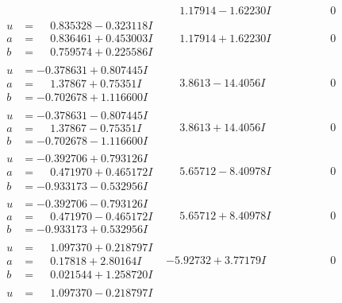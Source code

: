 \documentclass[1p]{elsarticle_modified}
\theoremstyle{definition}
\begin{document}
$$\begin{array}{c|c|c}
 & \phantom{-}1.17914 - 1.62230 I & \phantom{-0.000000 } 0 \\ \hline\begin{aligned}
u &= \phantom{-}0.835328 - 0.323118 I \\
a &= \phantom{-}0.836461 + 0.453003 I \\
b &= \phantom{-}0.759574 + 0.225586 I\end{aligned}
 & \phantom{-}1.17914 + 1.62230 I & \phantom{-0.000000 } 0 \\ \hline\begin{aligned}
u &= -0.378631 + 0.807445 I \\
a &= \phantom{-}1.37867 + 0.75351 I \\
b &= -0.702678 + 1.116600 I\end{aligned}
 & \phantom{-}3.8613 - 14.4056 I & \phantom{-0.000000 } 0 \\ \hline\begin{aligned}
u &= -0.378631 - 0.807445 I \\
a &= \phantom{-}1.37867 - 0.75351 I \\
b &= -0.702678 - 1.116600 I\end{aligned}
 & \phantom{-}3.8613 + 14.4056 I & \phantom{-0.000000 } 0 \\ \hline\begin{aligned}
u &= -0.392706 + 0.793126 I \\
a &= \phantom{-}0.471970 + 0.465172 I \\
b &= -0.933173 - 0.532956 I\end{aligned}
 & \phantom{-}5.65712 - 8.40978 I & \phantom{-0.000000 } 0 \\ \hline\begin{aligned}
u &= -0.392706 - 0.793126 I \\
a &= \phantom{-}0.471970 - 0.465172 I \\
b &= -0.933173 + 0.532956 I\end{aligned}
 & \phantom{-}5.65712 + 8.40978 I & \phantom{-0.000000 } 0 \\ \hline\begin{aligned}
u &= \phantom{-}1.097370 + 0.218797 I \\
a &= \phantom{-}0.17818 + 2.80164 I \\
b &= \phantom{-}0.021544 + 1.258720 I\end{aligned}
 & -5.92732 + 3.77179 I & \phantom{-0.000000 } 0 \\ \hline\begin{aligned}
u &= \phantom{-}1.097370 - 0.218797 I \\

\end{aligned}
\end{array}$$
\end{document}
